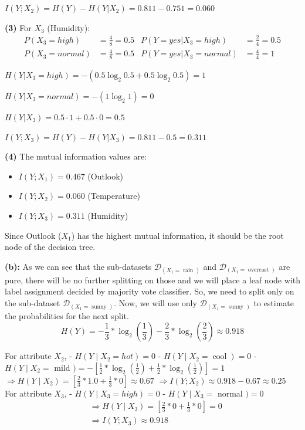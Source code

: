 $I(Y;X_2) = H(Y) - H(Y|X_2) = 0.811 - 0.751 = 0.060$

\textbf{(3)} For $X_3$ (Humidity):
\begin{align*}
P(X_3=high) &= \frac{4}{8} = 0.5 & P(Y=yes|X_3=high) &= \frac{2}{4} = 0.5 \\
P(X_3=normal) &= \frac{4}{8} = 0.5 & P(Y=yes|X_3=normal) &= \frac{4}{4} = 1
\end{align*}

$H(Y|X_3=high) = -(0.5\log_2 0.5 + 0.5\log_2 0.5) = 1$

$H(Y|X_3=normal) = -(1\log_2 1) = 0$

$H(Y|X_3) = 0.5 \cdot 1 + 0.5 \cdot 0 = 0.5$

$I(Y;X_3) = H(Y) - H(Y|X_3) = 0.811 - 0.5 = 0.311$

\textbf{(4)} The mutual information values are:
\begin{itemize}
  \item $I(Y;X_1) = 0.467$ (Outlook)
  \item $I(Y;X_2) = 0.060$ (Temperature)
  \item $I(Y;X_3) = 0.311$ (Humidity)
\end{itemize}

Since Outlook ($X_1$) has the highest mutual information, it should be the root node of the decision tree.

\textbf{(b):} 
As we can see that the sub-datasets $\mathcal{D}_{\left(X_1=\text { rain }\right)}$ and $\mathcal{D}_{\left(X_1=\text { overcast }\right)}$ are pure, there will be no further splitting on those and we will place a leaf node with label assignment decided by majority vote classifier. So, we need to split only on the sub-dataset $\mathcal{D}_{\left(X_1=\text { sunny }\right)}$. Now, we will use only $\mathcal{D}_{\left(X_1=\text { sunny }\right)}$ to estimate the probabilities for the next split.
$$
H(Y)=-\frac{1}{3} * \log _2\left(\frac{1}{3}\right)-\frac{2}{3} * \log _2\left(\frac{2}{3}\right) \approx 0.918
$$

For attribute $X_2$,
- $H\left(Y \mid X_2=h o t\right)=0$
- $H\left(Y \mid X_2=\operatorname{cool}\right)=0$
- $H\left(Y \mid X_2=\right.$ mild $)=-\left[\frac{1}{2} * \log _2\left(\frac{1}{2}\right)+\frac{1}{2} * \log _2\left(\frac{1}{2}\right)\right]=1$
$\Longrightarrow H\left(Y \mid X_2\right)=\left[\frac{2}{3} * 1.0+\frac{1}{3} * 0\right] \approx 0.67$
$\Longrightarrow I\left(Y ; X_2\right) \approx 0.918-0.67 \approx 0.25$
For attribute $X_3$,
- $H\left(Y \mid X_3=h i g h\right)=0$
- $H\left(Y \mid X_3=\right.$ normal $)=0$
$$
\begin{aligned}
& \Longrightarrow H\left(Y \mid X_3\right)=\left[\frac{2}{3} * 0+\frac{1}{3} * 0\right]=0 \\
& \Longrightarrow I\left(Y ; X_3\right) \approx 0.918
\end{aligned}
$$

